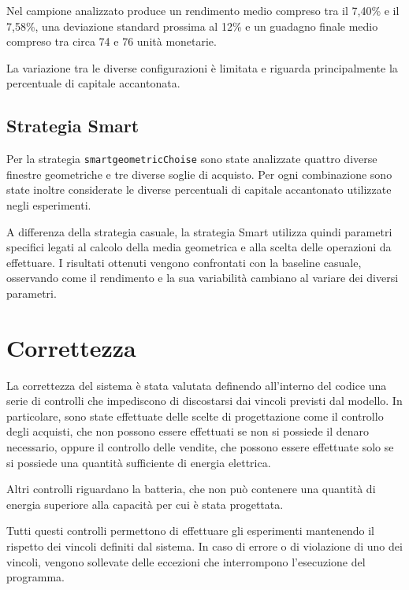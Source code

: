 \documentclass[12pt,a4paper,oneside]{report}
\begin{document}
Nel campione analizzato produce un rendimento medio compreso tra il 7,40\%
e il 7,58\%, una deviazione standard prossima al 12\% e un guadagno finale
medio compreso tra circa 74 e 76 unità monetarie.

La variazione tra le diverse configurazioni è limitata e riguarda
principalmente la percentuale di capitale accantonata.

\subsection{Strategia Smart}

Per la strategia \texttt{smartgeometricChoise} sono state analizzate quattro
diverse finestre geometriche e tre diverse soglie di acquisto. Per ogni
combinazione sono state inoltre considerate le diverse percentuali di
capitale accantonato utilizzate negli esperimenti.

A differenza della strategia casuale, la strategia Smart utilizza quindi
parametri specifici legati al calcolo della media geometrica e alla scelta
delle operazioni da effettuare. I risultati ottenuti vengono confrontati con
la baseline casuale, osservando come il rendimento e la sua variabilità
cambiano al variare dei diversi parametri.



\section{Correttezza}

La correttezza del sistema è stata valutata definendo all'interno del codice
una serie di controlli che impediscono di discostarsi dai vincoli previsti
dal modello. In particolare, sono state effettuate delle scelte di
progettazione come il controllo degli acquisti, che non possono essere
effettuati se non si possiede il denaro necessario, oppure il controllo delle
vendite, che possono essere effettuate solo se si possiede una quantità
sufficiente di energia elettrica.

Altri controlli riguardano la batteria, che non può contenere una quantità di
energia superiore alla capacità per cui è stata progettata.

Tutti questi controlli permettono di effettuare gli esperimenti mantenendo
il rispetto dei vincoli definiti dal sistema. In caso di errore o di
violazione di uno dei vincoli, vengono sollevate delle eccezioni che
interrompono l'esecuzione del programma.
\end{document}
